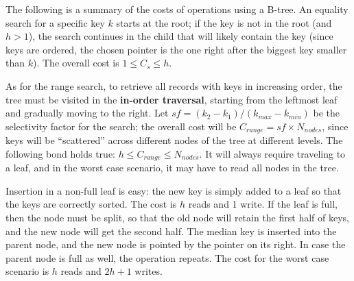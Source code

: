 The following is a summary of the costs of operations using a B-tree. An equality search for a specific key $k$ starts at the root; if the key is not in the root (and $h > 1$), the search continues in the child that will likely contain the key (since keys are ordered, the chosen pointer is the one right after the biggest key smaller than $k$). The overall cost is $1 \leq C_s \leq h$.

As for the range search, to retrieve all records with keys in increasing order, the tree must be visited in the \textbf{in-order traversal}, starting from the leftmost leaf and gradually moving to the right. Let $sf = (k_2 - k_1)/(k_{max} - k_{min})$ be the selectivity factor for the search; the overall cost will be $C_{range} = sf \times N_{nodes}$, since keys will be ``scattered'' across different nodes of the tree at different levels. The following bond holds true: $h \leq C_{range} \leq N_{nodes}$. It will always require traveling to a leaf, and in the worst case scenario, it may have to read all nodes in the tree.

Insertion in a non-full leaf is easy: the new key is simply added to a leaf so that the keys are correctly sorted. The cost is $h$ reads and 1 write. If the leaf is full, then the node must be split, so that the old node will retain the first half of keys, and the new node will get the second half. The median key is inserted into the parent node, and the new node is pointed by the pointer on its right. In case the parent node is full as well, the operation repeats. The cost for the worst case scenario is $h$ reads and $2h + 1$ writes.

